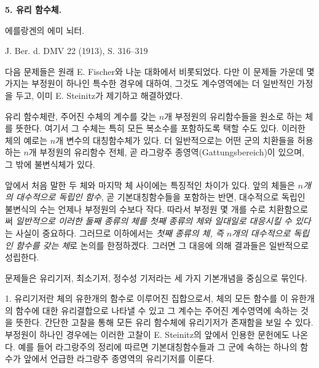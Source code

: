 
\begin{center}
{\Large\bfseries 5. 유리 함수체.}\par
\vspace{1.2em}
에를랑겐의 \textsc{에미 뇌터}.\par
\medskip
J. Ber. d. DMV 22 (1913), S. 316--319
\end{center}

\vspace{2em}

다음 문제들은 원래 E. Fischer와 나눈 대화에서 비롯되었다. 다만 이 문제들 가운데 몇 가지는 부정원이 하나인 특수한 경우에 대하여, 그것도 계수영역에는 더 일반적인 가정을 두고, 이미 E. Steinitz가 제기하고 해결하였다.

\glqq{}유리 함수체\grqq{}란, 주어진 수체의 계수를 갖는 $n$개 부정원의 유리함수들을 원소로 하는 체를 뜻한다. 여기서 그 수체는 특히 모든 복소수를 포함하도록 택할 수도 있다. 이러한 체의 예로는 $n$개 변수의 대칭함수체가 있다. 더 일반적으로는 어떤 군의 치환들을 허용하는 $n$개 부정원의 유리함수 전체, 곧 라그랑주 종영역(Gattungsbereich)이 있으며, 그 밖에 불변식체가 있다.

앞에서 처음 말한 두 체와 마지막 체 사이에는 특징적인 차이가 있다. 앞의 체들은 \emph{$n$개의 대수적으로 독립인 함수}, 곧 기본대칭함수들을 포함하는 반면, 대수적으로 독립인 불변식의 수는 언제나 부정원의 수보다 작다. 따라서 부정원 몇 개를 수로 치환함으로써 \emph{일반적으로 이러한 둘째 종류의 체를 첫째 종류의 체와 일대일로 대응시킬 수 있다}는 사실이 중요하다. 그러므로 이하에서는 \emph{첫째 종류의 체, 즉 $n$개의 대수적으로 독립인 함수를 갖는 체}로 논의를 한정하겠다. 그러면 그 대응에 의해 결과들은 일반적으로 성립한다.

문제들은 유리기저, 최소기저, 정수성 기저라는 세 가지 기본개념을 중심으로 묶인다.

1. \glqq{}유리기저\grqq{}란 체의 유한개의 함수로 이루어진 집합으로서, 체의 모든 함수를 이 유한개의 함수에 대한 유리결합으로 나타낼 수 있고 그 계수는 주어진 계수영역에 속하는 것을 뜻한다. 간단한 고찰을 통해 모든 유리 함수체에 유리기저가 존재함을 보일 수 있다. 부정원이 하나인 경우에는 이러한 고찰이 E. Steinitz의 앞에서 인용한 문헌에도 나온다. 예를 들어 라그랑주의 정리에 따르면 기본대칭함수들과 그 군에 속하는 하나의 함수가 앞에서 언급한 라그랑주 종영역의 유리기저를 이룬다.

